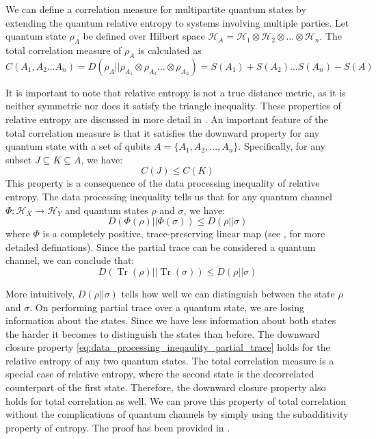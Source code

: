 \documentclass{article}
\DeclareMathOperator{\Tr}{Tr}
\newcommand{\hilb}{\mathcal{H}}
\begin{document}
We can define a correlation measure for multipartite quantum states by extending the quantum relative entropy to systems involving multiple parties. Let quantum state $\rho_A$ be defined over Hilbert space $\hilb_A = \hilb_{1} \otimes \hilb_{2} \otimes \ldots \otimes \hilb_{n}$. The total correlation measure of $\rho_A$ is calculated as 
 \begin{equation}
 \label{eq:multipartite_total_correlation}
     C(A_1, A_2 \dots A_n) = D(\rho_{A} || \rho_{A_1} \otimes \rho_{A_2} \dots \otimes  \rho_{A_n}) = S(A_1) + S(A_2) \dots S(A_n) - S(A)
 \end{equation}

It is important to note that relative entropy is not a true distance metric, as it is neither symmetric nor does it satisfy the triangle inequality. These properties of relative entropy are discussed in more detail in \cite{vedral2002relativeentropy}. An important feature of the total correlation measure is that it satisfies the downward property for any quantum state with a set of qubits $ A = \{A_1, A_2, \dots, A_n\} $. Specifically, for any subset $ J \subseteq K \subseteq A $, we have:
\begin{equation}
    \label{eq:downward_closure_total_correlation}
    C(J) \leq C(K)
\end{equation}
This property is a consequence of the data processing inequality of relative entropy. The data processing inequality tells us that for any quantum channel $ \Phi : \mathcal{H}_X \to \mathcal{H}_Y $ and quantum states $ \rho $ and $ \sigma $, we have:
\begin{equation}
\label{eq:data_processing_ineqaulity}
D(\Phi(\rho) || \Phi(\sigma)) \leq D(\rho || \sigma)
\end{equation}
where $ \Phi $ is a completely positive, trace-preserving linear map (see \cite{watrous2018theory}, \cite{dataprocessingnielsen} for more detailed definations). Since the partial trace can be considered a quantum channel, we can conclude that:
\begin{equation}
\label{eq:data_processing_ineqaulity_partial_trace}
D(\Tr(\rho) || \Tr(\sigma)) \leq D(\rho || \sigma)
\end{equation}

 More intuitively, $D(\rho || \sigma)$ tells how well we can distinguish between the state $\rho$ and $\sigma$. On performing partial trace over a quantum state, we are losing information about the states. Since we have less information about both states the harder it becomes to distinguish the states than before. The downward closure property \ref{eq:data_processing_ineqaulity_partial_trace} holds for the relative entropy of any two quantum states. The total correlation measure is a special case of relative entropy, where the second state is the decorrelated counterpart of the first state. Therefore, the downward closure property also holds for total correlation as well. We can prove this property of total correlation without the complications of quantum channels by simply using the subadditivity property of entropy. The proof has been provided in \cite{hamilton2023probing}.
\end{document}
